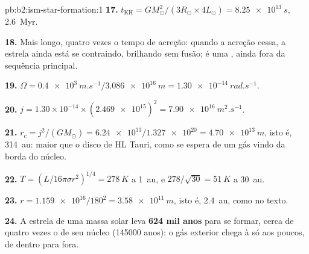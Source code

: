 \begin{solution}{pb:b2:ism-star-formation:1}
\textbf{17.} $t_{\mathrm{KH}} = GM_\odot^2/(3R_\odot\times4L_\odot) = \qty{8.25e13}{s}$,
\qty{2.6}{Myr}.

\textbf{18.} Mais longo, quatro vezes o tempo de acreção: quando a acreção cessa, a estrela
ainda está se contraindo, brilhando sem fusão; é uma , ainda fora da
sequência principal.

\textbf{19.} $\Omega = \qty{0.4e3}{m.s^{-1}}/\qty{3.086e16}{m} = \qty{1.30e-14}{rad.s^{-1}}$.

\textbf{20.} $j = 1.30\times10^{-14}\times(\num{2.469e15})^2 = \qty{7.90e16}{m^2.s^{-1}}$.

\textbf{21.} $r_c = j^2/(GM_\odot) = \num{6.24e33}/\num{1.327e20} = \qty{4.70e13}{m}$, isto
é, \qty{314}{au}: maior que o disco de HL Tauri, como se espera de um gás vindo da borda do
núcleo.

\textbf{22.} $T = (L/16\pi\sigma r^2)^{1/4} = \qty{278}{K}$ a \qty{1}{au}, e
$278/\sqrt{30} = \qty{51}{K}$ a \qty{30}{au}.

\textbf{23.} $r = \num{1.159e16}/180^2 = \qty{3.58e11}{m}$, isto é, \qty{2.4}{au}, como no texto.

\textbf{24.} A estrela de uma massa solar leva
\textbf{\qty[text-series-to-math=true]{624}{} mil anos} para se formar, cerca de quatro
vezes o  de seu núcleo (\num{145000} anos): o gás exterior chega à
 só aos poucos, de dentro para fora.
\end{solution}
